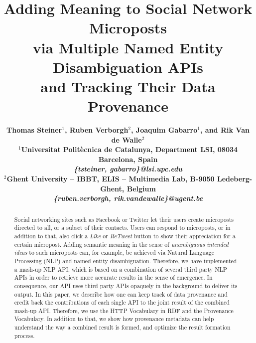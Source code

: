 \documentclass[twocolumn]{article}
\begin{document}
\pagestyle{empty}
\sloppy


\title{Adding Meaning to Social Network Microposts\\ via Multiple Named Entity Disambiguation APIs\\ and Tracking Their Data Provenance}

\author{\bf Thomas Steiner$^1$, Ruben Verborgh$^2$, Joaquim Gabarro$^1$, and Rik Van de Walle$^2$\\[1em]
$^1$Universitat Polit\`ecnica de Catalunya,
Department LSI,
08034 Barcelona, Spain\\
\textit{\{tsteiner, gabarro\}@lsi.upc.edu}\\[1em]
$^2$Ghent University -- IBBT,
ELIS -- Multimedia Lab,
B-9050 Ledeberg-Ghent, Belgium\\
\textit{\{ruben.verborgh, rik.vandewalle\}@ugent.be}}

\maketitle

\begin{abstract}
Social networking sites such as Facebook or Twitter let their users  create microposts directed to all, or a subset of their contacts. Users can respond to microposts, or in addition to that, also click a \textit{Like} or \textit{ReTweet} button to show their appreciation for a certain micropost. Adding semantic meaning in the sense of \emph{unambiguous intended ideas} to such microposts can, for example, be achieved via Natural Language Processing (NLP) and named entity disambiguation. Therefore, we have implemented a mash-up NLP API, which is based on a combination of several third party NLP APIs in order to retrieve more accurate results in the sense of emergence. In consequence, our API uses third party APIs opaquely in the background to deliver its output. In this paper, we describe how one can keep track of data provenance and credit back the contributions of each single API to the joint result of the combined mash-up API. Therefore, we use the HTTP Vocabulary in RDF and the Provenance Vocabulary. In addition to that, we show how provenance metadata can help understand the way a combined result is formed, and optimize the result formation process. 
\end{abstract}

\end{document}
